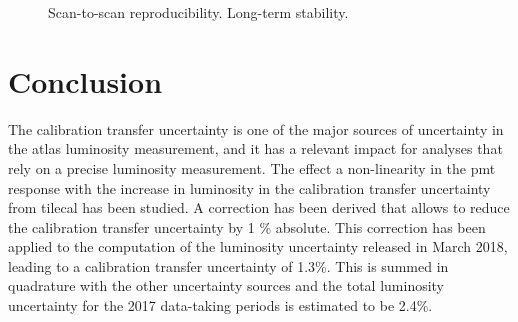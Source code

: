 \begin{figure}[htbp]
\centering
{}
\caption{ Scan-to-scan reproducibility.  Long-term stability.}
\label{fig:apppmt:othersyst}
\end{figure}


\section{Conclusion}

The calibration transfer uncertainty is one of the major sources of uncertainty in the \gls{atlas} luminosity 
measurement, and it has a relevant impact for analyses that rely on a precise luminosity measurement. 
The effect a non-linearity in the \gls{pmt} response with the increase in luminosity in the calibration transfer uncertainty from 
\gls{tilecal} has been studied. 
A correction has been derived that allows to reduce the calibration transfer uncertainty by 1 \% absolute.
This correction has been applied to the computation of the luminosity uncertainty released in March 2018, 
leading to a calibration transfer uncertainty of 1.3\%. 
This is summed in quadrature with the other uncertainty sources and 
the total luminosity uncertainty for the 2017 data-taking periods is estimated to be 2.4\%. 




